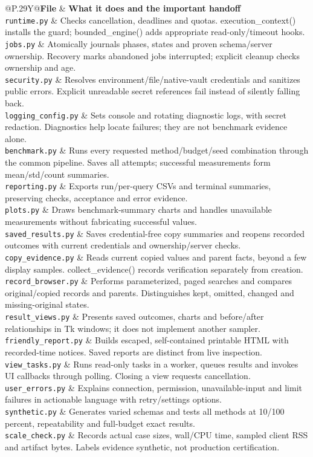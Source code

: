 \documentclass[11pt,a4paper]{article}
\makeatletter
\newcommand{\filemap}[1]{\begingroup\small\par\noindent\begin{tabularx}{\linewidth}{@{}P{.29\linewidth}Y@{}}\toprule\textbf{File} & \textbf{What it does and the important handoff}\\\midrule #1\bottomrule\end{tabularx}\par\endgroup}
\makeatother
\begin{document}
\filemap{
\texttt{runtime.py} & Checks cancellation, deadlines and quotas. execution\_context() installs the guard; bounded\_engine() adds appropriate read-only/timeout hooks.\\[5pt]
\texttt{jobs.py} & Atomically journals phases, states and proven schema/server ownership. Recovery marks abandoned jobs interrupted; explicit cleanup checks ownership and age.\\[5pt]
\texttt{security.py} & Resolves environment/file/native-vault credentials and sanitizes public errors. Explicit unreadable secret references fail instead of silently falling back.\\[5pt]
\texttt{logging\_config.py} & Sets console and rotating diagnostic logs, with secret redaction. Diagnostics help locate failures; they are not benchmark evidence alone.\\[5pt]
\texttt{benchmark.py} & Runs every requested method/budget/seed combination through the common pipeline. Saves all attempts; successful measurements form mean/std/count summaries.\\[5pt]
\texttt{reporting.py} & Exports run/per-query CSVs and terminal summaries, preserving checks, acceptance and error evidence.\\[5pt]
\texttt{plots.py} & Draws benchmark-summary charts and handles unavailable measurements without fabricating successful values.\\[5pt]
\texttt{saved\_results.py} & Saves credential-free copy summaries and reopens recorded outcomes with current credentials and ownership/server checks.\\[5pt]
\texttt{copy\_evidence.py} & Reads current copied values and parent facts, beyond a few display samples. collect\_evidence() records verification separately from creation.\\[5pt]
\texttt{record\_browser.py} & Performs parameterized, paged searches and compares original/copied records and parents. Distinguishes kept, omitted, changed and missing-original states.\\[5pt]
\texttt{result\_views.py} & Presents saved outcomes, charts and before/after relationships in Tk windows; it does not implement another sampler.\\[5pt]
\texttt{friendly\_report.py} & Builds escaped, self-contained printable HTML with recorded-time notices. Saved reports are distinct from live inspection.\\[5pt]
\texttt{view\_tasks.py} & Runs read-only tasks in a worker, queues results and invokes UI callbacks through polling. Closing a view requests cancellation.\\[5pt]
\texttt{user\_errors.py} & Explains connection, permission, unavailable-input and limit failures in actionable language with retry/settings options.\\[5pt]
\texttt{synthetic.py} & Generates varied schemas and tests all methods at 10/100 percent, repeatability and full-budget exact results.\\[5pt]
\texttt{scale\_check.py} & Records actual case sizes, wall/CPU time, sampled client RSS and artifact bytes. Labels evidence synthetic, not production certification.\\[3pt]
}
\end{document}
